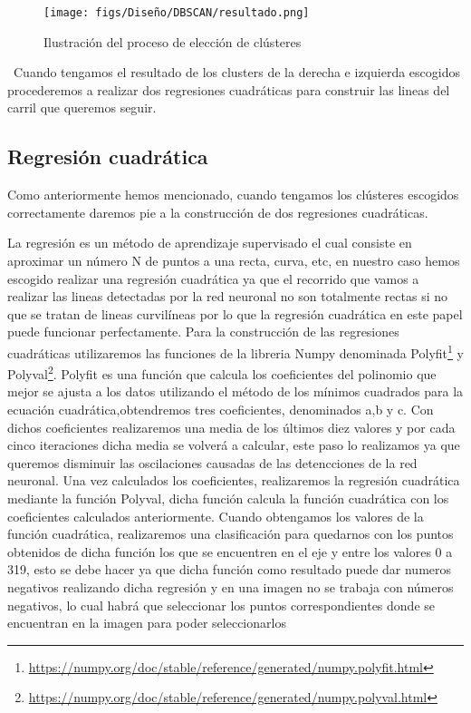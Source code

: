 \begin{figure} [H]
  \begin{center}
    \texttt{[image: figs/Diseño/DBSCAN/resultado.png]}
  \end{center}
  \caption{Ilustración del proceso de elección de clústeres }
  \label{fig:DBSCAN_imagen}
\end{figure}\
Cuando tengamos el resultado de los clusters de la derecha e izquierda escogidos procederemos a realizar dos regresiones cuadráticas para construir las lineas del carril que queremos seguir.
\subsection{Regresión cuadrática}
\label{sec:Regresión cuadrática}
Como anteriormente hemos mencionado, cuando tengamos los clústeres escogidos correctamente daremos pie a la construcción de dos regresiones cuadráticas. \newline 

La regresión es un método de aprendizaje supervisado el cual consiste en aproximar un número N de puntos a una recta, curva, etc, en nuestro caso hemos escogido realizar una regresión cuadrática ya que el recorrido
que vamos a realizar las lineas detectadas por la red neuronal no son totalmente rectas si no que se tratan de lineas curvilíneas por lo que la regresión cuadrática en este papel puede 
funcionar perfectamente. 
Para la construcción de las regresiones cuadráticas utilizaremos las funciones de la libreria Numpy denominada Polyfit\footnote{\url{https://numpy.org/doc/stable/reference/generated/numpy.polyfit.html}}
y Polyval\footnote{\url{ https://numpy.org/doc/stable/reference/generated/numpy.polyval.html}}. 
Polyfit es una función que calcula los  coeficientes del polinomio que mejor se ajusta a los datos utilizando el método de los mínimos 
cuadrados para la ecuación cuadrática,obtendremos tres coeficientes, denominados a,b y c. \newline
\newline
Con dichos coeficientes realizaremos una media de los últimos diez valores y por cada cinco iteraciones dicha media se volverá a calcular, este paso lo realizamos ya que 
queremos disminuir las oscilaciones causadas de las detencciones de la red neuronal. Una vez calculados los coeficientes, realizaremos la regresión cuadrática mediante la función Polyval, dicha función calcula
la función cuadrática con los coeficientes calculados anteriormente. \newline 
Cuando obtengamos los valores de la función cuadrática, realizaremos una clasificación para quedarnos con los puntos obtenidos
de dicha función los que se encuentren en el eje y entre los valores 0 a 319, esto se debe hacer ya que dicha función como resultado puede dar numeros negativos realizando dicha regresión y en una 
imagen no se trabaja con números negativos, lo cual habrá que seleccionar los puntos correspondientes donde se encuentran en la imagen para poder seleccionarlos \newline

